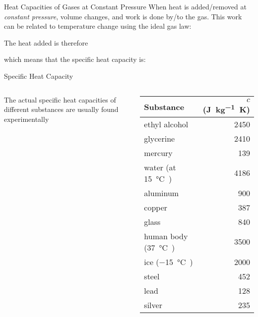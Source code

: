 \documentclass[12pt,aspectratio=169,dvipsnames]{beamer}
\begin{document}
\begin{frame}{Heat Capacities of Gases at Constant Pressure}
  When heat is added/removed at \emph{constant pressure}, volume changes,
  and work is done by/to the gas. This work can be related to temperature change
  using the ideal gas law:

  
  \vspace{-.15in}The heat added is therefore


%
%
%
%
%

  which means that the specific heat capacity is:

\end{frame}



\begin{frame}{Specific Heat Capacity}
  \begin{columns}
    The actual specific heat capacities of different substances are usually
    found experimentally

    \centering
    \begin{tabular}{|l|r|}
      \hline
      \rowcolor{pink}
      \textbf{Substance} & $c$ (\si{\joule\per\kilo\gram.\kelvin}) \\
      \hline
      ethyl alcohol & 2450 \\
      glycerine     & 2410 \\
      mercury       & 139 \\
      water (at \SI{15}\celsius) & 4186 \\
      \hline
      aluminum & 900 \\
      copper   & 387 \\
      glass    & 840 \\
      human body (\SI{37}\celsius) & 3500 \\
      ice (\SI{-15}\celsius)       & 2000 \\
      steel    & 452 \\
      lead     & 128 \\
      silver   & 235 \\
      \hline
    \end{tabular}
  \end{columns}
\end{frame}
\end{document}
